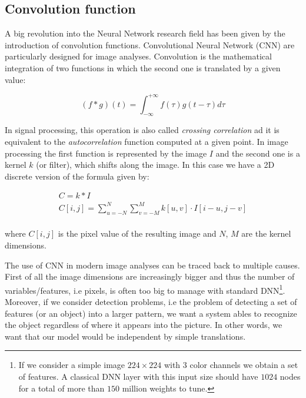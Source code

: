 \documentclass{standalone}
\begin{document}

\subsection[Convolution function]{Convolution function}\label{NN:convolutional}

A big revolution into the Neural Network research field has been given by the introduction of convolution functions.
Convolutional Neural Network (CNN) are particularly designed for image analyses.
Convolution is the mathematical integration of two functions in which the second one is translated by a given value:

\begin{equation}
(f * g)(t) = \int_{-\infty}^{+\infty} f(\tau)g(t - \tau)d\tau
\end{equation}

In signal processing, this operation is also called \emph{crossing correlation} ad it is equivalent to the \emph{autocorrelation} function computed at a given point.
In image processing the first function is represented by the image $I$ and the second one is a kernel $k$ (or filter), which shifts along the image.
In this case we have a 2D discrete version of the formula given by:

\begin{equation}
\begin{aligned}
C = k * I
\\
C[i, j] = \sum_{u=-N}^{N} \sum_{v=-M}^{M} k[u, v] \cdot I[i - u, j - v]
\end{aligned}
\end{equation}
\\
where $C[i, j]$ is the pixel value of the resulting image and $N$, $M$ are the kernel dimensions.

The use of CNN in modern image analyses can be traced back to multiple causes.
First of all the image dimensions are increasingly bigger and thus the number of variables/features, i.e pixels, is often too big to manage with standard DNN\footnote{
  If we consider a simple image $224\times224$ with $3$ color channels we obtain a set of  features.
  A classical DNN layer with this input size should have $1024$ nodes for a total of more than $150$ million weights to tune.
}.
Moreover, if we consider detection problems, i.e the problem of detecting a set of features (or an object) into a larger pattern, we want a system ables to recognize the object regardless of where it appears into the picture.
In other words, we want that our model would be independent by simple translations.
\end{document}
